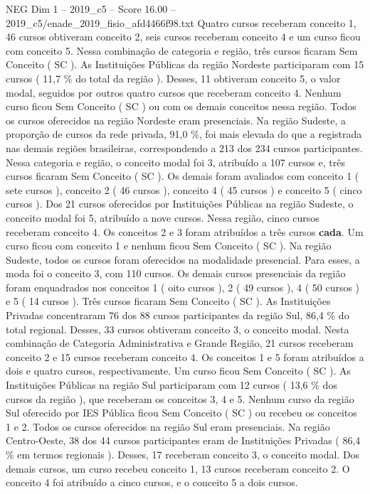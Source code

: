 \begin{textsample}{NEG Dim 1 – 2019\_c5 – Score 16.00 – 2019\_c5/enade\_2019\_fisio\_afd4466f98.txt}
Quatro cursos receberam conceito 1, 46 cursos obtiveram conceito 2, seis cursos receberam conceito 4 e um curso ficou com conceito 5.
Nessa combinação de categoria e região, três cursos ficaram Sem Conceito ( SC ).
As Instituições Públicas da região Nordeste participaram com 15 cursos ( 11,7 \% do total da região ).
Desses, 11 obtiveram conceito 5, o valor modal, seguidos por outros quatro cursos que receberam conceito 4.
Nenhum curso ficou Sem Conceito ( SC ) ou com os demais conceitos nessa região.
Todos os cursos oferecidos na região Nordeste eram presenciais.
Na região Sudeste, a proporção de cursos da rede privada, 91,0 \%, foi mais elevada do que a registrada nas demais regiões brasileiras, correspondendo a 213 dos 234 cursos participantes.
Nessa categoria e região, o conceito modal foi 3, atribuído a 107 cursos e, três cursos ficaram Sem Conceito ( SC ).
Os demais foram avaliados com conceito 1 ( sete cursos ), conceito 2 ( 46 cursos ), conceito 4 ( 45 cursos ) e conceito 5 ( cinco cursos ).
Dos 21 cursos oferecidos por Instituições Públicas na região Sudeste, o conceito modal foi 5, atribuído a nove cursos.
Nessa região, cinco cursos receberam conceito 4.
Os conceitos 2 e 3 foram atribuídos a três cursos \textbf{cada}.
Um curso ficou com conceito 1 e nenhum ficou Sem Conceito ( SC ).
Na região Sudeste, todos os cursos foram oferecidos na modalidade presencial.
Para esses, a moda foi o conceito 3, com 110 cursos.
Os demais cursos presenciais da região foram enquadrados nos conceitos 1 ( oito cursos ), 2 ( 49 cursos ), 4 ( 50 cursos ) e 5 ( 14 cursos ).
Três cursos ficaram Sem Conceito ( SC ).
As Instituições Privadas concentraram 76 dos 88 cursos participantes da região Sul, 86,4 \% do total regional.
Desses, 33 cursos obtiveram conceito 3, o conceito modal.
Nesta combinação de Categoria Administrativa e Grande Região, 21 cursos receberam conceito 2 e 15 cursos receberam conceito 4.
Os conceitos 1 e 5 foram atribuídos a dois e quatro cursos, respectivamente.
Um curso ficou Sem Conceito ( SC ).
As Instituições Públicas na região Sul participaram com 12 cursos ( 13,6 \% dos cursos da região ), que receberam os conceitos 3, 4 e 5.
Nenhum curso da região Sul oferecido por IES Pública ficou Sem Conceito ( SC ) ou recebeu os conceitos 1 e 2.
Todos os cursos oferecidos na região Sul eram presenciais.
Na região Centro-Oeste, 38 dos 44 cursos participantes eram de Instituições Privadas ( 86,4 \% em termos regionais ).
Desses, 17 receberam conceito 3, o conceito modal.
Dos demais cursos, um curso recebeu conceito 1, 13 cursos receberam conceito 2.
O conceito 4 foi atribuído a cinco cursos, e o conceito 5 a dois cursos.

\end{textsample}
